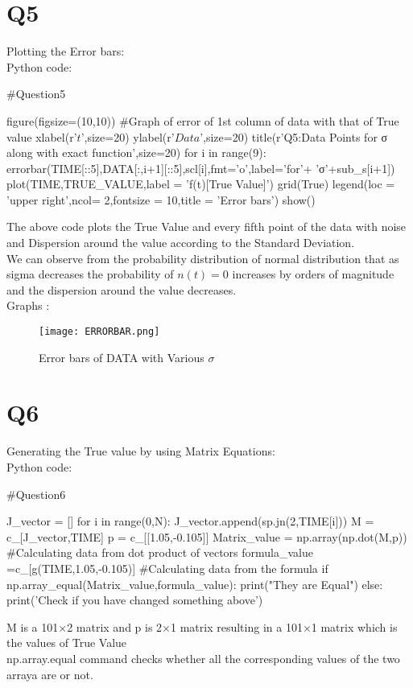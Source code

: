 \documentclass[12pt, a4paper]{report}
\begin{document}
\section*{Q5}
Plotting the Error bars:\\
 Python code:
\begin{py_code}
#Question5

figure(figsize=(10,10))  #Graph of error of  1st column of data with that of True value
xlabel(r'$t$',size=20)
ylabel(r'$Data$',size=20)
title(r'Q5:Data Points for σ along with exact function',size=20)
for i in range(9):
    errorbar(TIME[::5],DATA[:,i+1][::5],scl[i],fmt='o',label='for'+ 'σ'+sub_s[i+1])
plot(TIME,TRUE_VALUE,label = 'f(t)[True Value]')
grid(True)
legend(loc = 'upper right',ncol= 2,fontsize = 10,title = 'Error bars')
show()
\end{py_code}
The above code plots the True Value and every fifth point of the data with noise and Dispersion around the value according to the Standard Deviation. \\
We can observe from the probability distribution of normal distribution that as sigma decreases the probability of $n(t)=0$ increases by orders of magnitude and the dispersion around the value decreases. \\
Graphs :
 \begin{figure}[H]
	\centering
	\texttt{[image: ERRORBAR.png]}  %
	\caption{Error bars of DATA with Various $\sigma$}
	\label{fig:ERRORBAR}
\end{figure} 
\section*{Q6}
Generating the True value by using Matrix Equations:\\
Python code:
\begin{py_code}
#Question6

J_vector = []
for i in range(0,N):
    J_vector.append(sp.jn(2,TIME[i]))
M = c_[J_vector,TIME]
p = c_[[1.05,-0.105]]
Matrix_value = np.array(np.dot(M,p)) #Calculating data from dot product of vectors
formula_value =c_[g(TIME,1.05,-0.105)] #Calculating data from the formula
if np.array_equal(Matrix_value,formula_value):
    print("They are Equal")
else:
    print('Check if you have changed something above')
\end{py_code}
M is a 101$\times$2 matrix and p is 2$\times$1 matrix resulting in a 101$\times$1 matrix which is the values of True Value \\
np.array.equal command checks whether all the corresponding values of the two arraya are or not.
\end{document}
